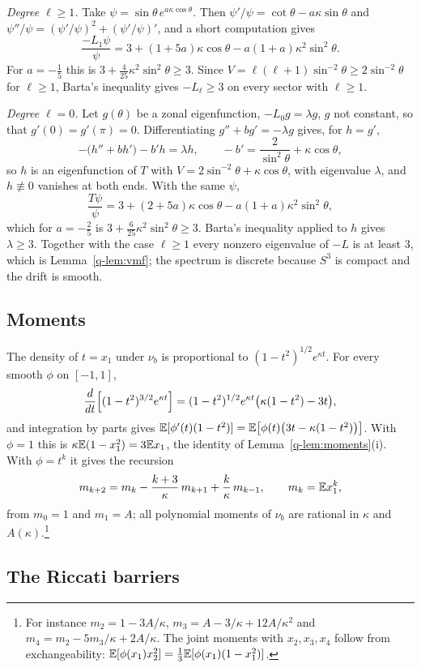 \emph{Degree $\ell\ge1$.} Take $\psi=\sin\theta\,e^{a\kappa\cos\theta}$. Then
$\psi'/\psi=\cot\theta-a\kappa\sin\theta$ and
$\psi''/\psi=(\psi'/\psi)^2+(\psi'/\psi)'$, and a short computation gives
\[
\frac{-L_1\psi}\psi=3+(1+5a)\kappa\cos\theta-a(1+a)\kappa^2\sin^2\theta .
\]
For $a=-\frac15$ this is $3+\frac4{25}\kappa^2\sin^2\theta\ge3$. Since
$V=\ell(\ell+1)\sin^{-2}\theta\ge2\sin^{-2}\theta$ for $\ell\ge1$, Barta's
inequality gives $-L_\ell\ge3$ on every sector with $\ell\ge1$.

\emph{Degree $\ell=0$.} Let $g(\theta)$ be a zonal eigenfunction,
$-L_0g=\lambda g$, $g$ not constant, so that $g'(0)=g'(\pi)=0$. Differentiating
$g''+bg'=-\lambda g$ gives, for $h=g'$,
\[
-\bigl(h''+bh'\bigr)-b'h=\lambda h,\qquad -b'=\frac2{\sin^2\theta}+\kappa
\cos\theta,
\]
so $h$ is an eigenfunction of $T$ with $V=2\sin^{-2}\theta+\kappa\cos\theta$,
with eigenvalue $\lambda$, and $h\not\equiv0$ vanishes at both ends. With the
same $\psi$,
\[
\frac{T\psi}\psi=3+(2+5a)\kappa\cos\theta-a(1+a)\kappa^2\sin^2\theta,
\]
which for $a=-\frac25$ is $3+\frac6{25}\kappa^2\sin^2\theta\ge3$. Barta's
inequality applied to $h$ gives $\lambda\ge3$. Together with the case
$\ell\ge1$ every nonzero eigenvalue of $-L$ is at least $3$, which is
Lemma~\ref{q-lem:vmf}; the spectrum is discrete because $S^3$ is compact and
the drift is smooth.

\subsection{Moments}

The density of $t=x_1$ under $\nu_b$ is proportional to $(1-t^2)^{1/2}e^{
\kappa t}$. For every smooth $\phi$ on $[-1,1]$,
\[
\frac d{dt}\Bigl[(1-t^2)^{3/2}e^{\kappa t}\Bigr]=(1-t^2)^{1/2}e^{\kappa t}
\bigl(\kappa(1-t^2)-3t\bigr),
\]
and integration by parts gives $\mathbb{E}[\phi'(t)(1-t^2)]=\mathbb{E}\bigl[\phi(t)\bigl(3t-
\kappa(1-t^2)\bigr)\bigr]$. With $\phi=1$ this is $\kappa\mathbb{E}(1-x_1^2)=3\mathbb{E} x_1$,
the identity of Lemma~\ref{q-lem:moments}(i). With $\phi=t^k$ it gives the
recursion
\[
m_{k+2}=m_k-\frac{k+3}\kappa\,m_{k+1}+\frac k\kappa\,m_{k-1},\qquad m_k=\mathbb{E}
x_1^k,
\]
from $m_0=1$ and $m_1=A$; all polynomial moments of $\nu_b$ are rational in
$\kappa$ and $A(\kappa)$.\footnote{For instance $m_2=1-3A/\kappa$,
$m_3=A-3/\kappa+12A/\kappa^2$ and $m_4=m_2-5m_3/\kappa+2A/\kappa$. The joint moments
with $x_2,x_3,x_4$ follow from exchangeability:
$\mathbb{E}[\phi(x_1)x_2^2]=\frac13\mathbb{E}[\phi(x_1)(1-x_1^2)]$.}

\subsection{The Riccati barriers}


